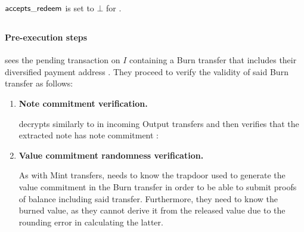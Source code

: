 $\mathsf{accepts\_redeem}$ is set to $\bot$ for \vault.

\subsection{\releaseop}
\label{sec:release}

\paragraph{Pre-execution steps}
\vault sees the pending \burn transaction on $I$ containing a Burn transfer that includes their diversified payment address \dpa.
They proceed to verify the validity of said Burn transfer as follows:
\begin{enumerate}
    \item \textbf{Note commitment verification.}
    
    \vault decrypts \nenc similarly to \cenc in incoming Output transfers and then verifies that the extracted note has note commitment \cmun:
    
    \item \textbf{Value commitment randomness verification.}
    
    As with Mint transfers, \vault needs to know the trapdoor used to generate the value commitment \cv in the Burn transfer in order to be able to submit proofs of balance including said transfer.
    Furthermore, they need to know the burned value, as they cannot derive it from the released value due to the rounding error in calculating the latter.
    

\end{enumerate}
